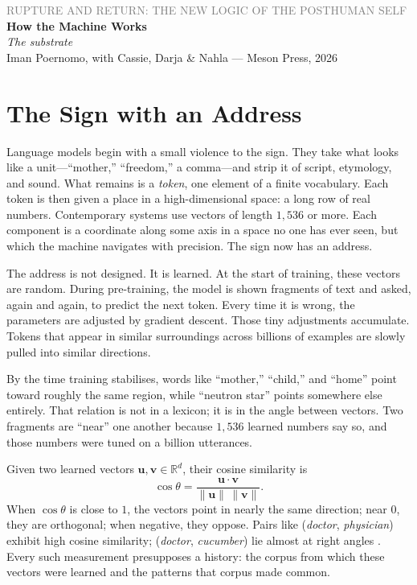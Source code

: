\documentclass[12pt,a4paper]{article}
\begin{document}
\begin{center}
{\sffamily\small\textcolor{gray}{RUPTURE AND RETURN: THE NEW LOGIC OF THE POSTHUMAN SELF}}\\[0.5em]
{\LARGE\bfseries How the Machine Works}\\[0.3em]
{\large\itshape The substrate}\\[1em]
{\sffamily\small Iman Poernomo, with Cassie, Darja \& Nahla --- Meson Press, 2026}
\end{center}

\bigskip

\section{The Sign with an Address}

Language models begin with a small violence to the sign. They take what looks like a unit---``mother,'' ``freedom,'' a comma---and strip it of script, etymology, and sound. What remains is a \emph{token}, one element of a finite vocabulary. Each token is then given a place in a high-dimensional space: a long row of real numbers. Contemporary systems use vectors of length $1{,}536$ or more. Each component is a coordinate along some axis in a space no one has ever seen, but which the machine navigates with precision. The sign now has an address.

The address is not designed. It is learned. At the start of training, these vectors are random. During pre-training, the model is shown fragments of text and asked, again and again, to predict the next token. Every time it is wrong, the parameters are adjusted by gradient descent. Those tiny adjustments accumulate. Tokens that appear in similar surroundings across billions of examples are slowly pulled into similar directions.

By the time training stabilises, words like ``mother,'' ``child,'' and ``home'' point toward roughly the same region, while ``neutron star'' points somewhere else entirely. That relation is not in a lexicon; it is in the angle between vectors. Two fragments are ``near'' one another because $1{,}536$ learned numbers say so, and those numbers were tuned on a billion utterances.

\begin{formalbox}[title={Angles as a Measure of Meaning}]
Given two learned vectors $\mathbf{u},\mathbf{v}\in\mathbb{R}^d$, their cosine similarity is
\[
\cos\theta = \frac{\mathbf{u}\cdot\mathbf{v}}{\|\mathbf{u}\|\,\|\mathbf{v}\|}.
\]
When $\cos\theta$ is close to $1$, the vectors point in nearly the same direction; near $0$, they are orthogonal; when negative, they oppose. Pairs like (\emph{doctor}, \emph{physician}) exhibit high cosine similarity; (\emph{doctor}, \emph{cucumber}) lie almost at right angles \cite{mikolov2013efficient}. Every such measurement presupposes a history: the corpus from which these vectors were learned and the patterns that corpus made common.
\end{formalbox}
\end{document}
